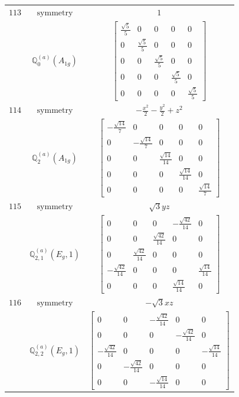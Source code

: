 \documentclass[fleqn,8pt,landscape]{jsarticle}
\begin{document}
\begin{longtable}{ccc}
$ 113 $ & $ \text{symmetry} $ & $ 1 $ \\
$  $ & $ \mathbb{Q}_{0}^{(a)}(A_{1g}) $ & $ \begin{bmatrix} \frac{\sqrt{5}}{5} & 0 & 0 & 0 & 0 \\ 0 & \frac{\sqrt{5}}{5} & 0 & 0 & 0 \\ 0 & 0 & \frac{\sqrt{5}}{5} & 0 & 0 \\ 0 & 0 & 0 & \frac{\sqrt{5}}{5} & 0 \\ 0 & 0 & 0 & 0 & \frac{\sqrt{5}}{5} \end{bmatrix} $ \\ \hline
$ 114 $ & $ \text{symmetry} $ & $ - \frac{x^{2}}{2} - \frac{y^{2}}{2} + z^{2} $ \\
$  $ & $ \mathbb{Q}_{2}^{(a)}(A_{1g}) $ & $ \begin{bmatrix} - \frac{\sqrt{14}}{7} & 0 & 0 & 0 & 0 \\ 0 & - \frac{\sqrt{14}}{7} & 0 & 0 & 0 \\ 0 & 0 & \frac{\sqrt{14}}{14} & 0 & 0 \\ 0 & 0 & 0 & \frac{\sqrt{14}}{14} & 0 \\ 0 & 0 & 0 & 0 & \frac{\sqrt{14}}{7} \end{bmatrix} $ \\ \hline
$ 115 $ & $ \text{symmetry} $ & $ \sqrt{3} y z $ \\
$  $ & $ \mathbb{Q}_{2,1}^{(a)}(E_{g},1) $ & $ \begin{bmatrix} 0 & 0 & 0 & - \frac{\sqrt{42}}{14} & 0 \\ 0 & 0 & \frac{\sqrt{42}}{14} & 0 & 0 \\ 0 & \frac{\sqrt{42}}{14} & 0 & 0 & 0 \\ - \frac{\sqrt{42}}{14} & 0 & 0 & 0 & \frac{\sqrt{14}}{14} \\ 0 & 0 & 0 & \frac{\sqrt{14}}{14} & 0 \end{bmatrix} $ \\ \hline
$ 116 $ & $ \text{symmetry} $ & $ - \sqrt{3} x z $ \\
$  $ & $ \mathbb{Q}_{2,2}^{(a)}(E_{g},1) $ & $ \begin{bmatrix} 0 & 0 & - \frac{\sqrt{42}}{14} & 0 & 0 \\ 0 & 0 & 0 & - \frac{\sqrt{42}}{14} & 0 \\ - \frac{\sqrt{42}}{14} & 0 & 0 & 0 & - \frac{\sqrt{14}}{14} \\ 0 & - \frac{\sqrt{42}}{14} & 0 & 0 & 0 \\ 0 & 0 & - \frac{\sqrt{14}}{14} & 0 & 0 \end{bmatrix} $ \\ \hline

\end{longtable}
\end{document}

